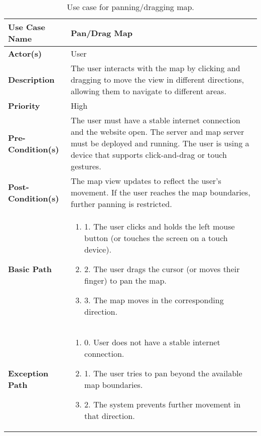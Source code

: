 \begin{table}[h]
    \centering
    \renewcommand{\arraystretch}{1.5}
    \begin{tabularx}{\textwidth}{|l|X|}
        \hline
        \rowcolor{gray!20}
        \textbf{Use Case Name} & Pan/Drag Map \\
        \hline
        \textbf{Actor(s)} & User \\
        \hline
        \textbf{Description} & The user interacts with the map by clicking and dragging to move the view in different directions, allowing them to navigate to different areas. \\ 
        \hline
        \textbf{Priority} & High \\
        \hline
        \textbf{Pre-Condition(s)} & The user must have a stable internet connection and the website open. The server and map server must be deployed and running. The user is using a device that supports click-and-drag or touch gestures.\\
        \hline
        \textbf{Post-Condition(s)} & The map view updates to reflect the user's movement. If the user reaches the map boundaries, further panning is restricted. \\
        \hline
        \textbf{Basic Path} &  
        \begin{enumerate}[label=,left=0pt]
            \item 1. The user clicks and holds the left mouse button (or touches the screen on a touch device).
            \item 2. The user drags the cursor (or moves their finger) to pan the map.
            \item 3. The map moves in the corresponding direction.
        \end{enumerate} \\
        \hline
        \textbf{Exception Path} & 
        \begin{enumerate}[label=,left=0pt]
            \item 0. User does not have a stable internet connection.
            \item 1. The user tries to pan beyond the available map boundaries.
            \item 2. The system prevents further movement in that direction.
        \end{enumerate} \\
        \hline
    \end{tabularx}
    \caption[Use Case Specification: Pan/Drag Map]{Use case for panning/dragging map.}
    \label{tab:use_case_drag_map_appendix}
\end{table}

